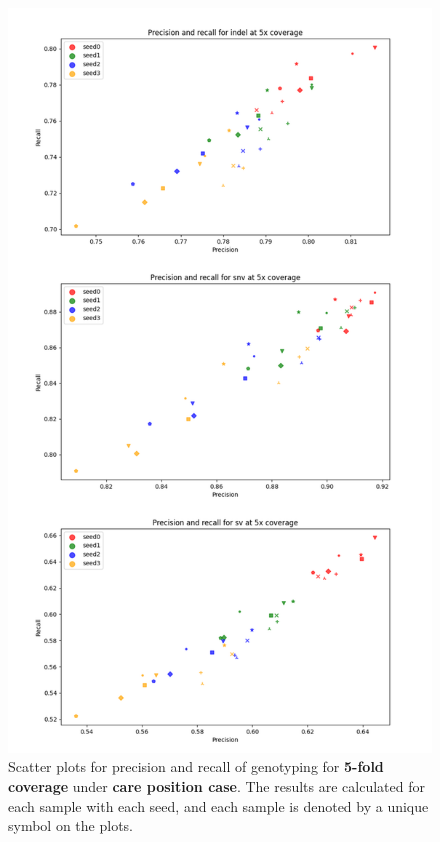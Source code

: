 \documentclass{PHlab-thesis}
\begin{document}
\begin{figure}[ht!]
	\centering
	\includegraphics[scale=0.5]{figures/care_genotyping_5x.png}
	\caption{Scatter plots for precision and recall of genotyping for \textbf{5-fold coverage} under \textbf{care position case}. The results are calculated for each sample with each seed, and each sample is denoted by a unique symbol on the plots.}
	\label{fig:care_genotyping_5x} %
\end{figure}
\end{document}
